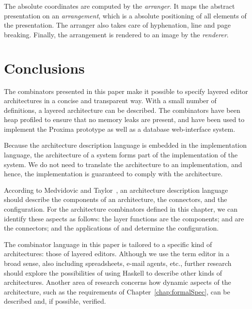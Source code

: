 \documentclass[preprint,natbib]{sigplanconf}
\begin{document}
The absolute coordinates are computed by the {\em arranger}. It maps the abstract presentation on an {\em arrangement}, which is a absolute positioning of all elements of the presentation. The arranger also takes care of hyphenation, line and page breaking. Finally, the arrangement is rendered to an image by the {\em renderer}.
\ec


%																
%																
%																
\section{Conclusions} \label{sect:haskellconclusions}

The combinators presented in this paper make it possible to specify layered editor architectures in a concise and transparent way. With a small number of definitions, a layered architecture can be described. The combinators have been heap profiled to ensure that no memory leaks are present, and have been used to implement the Proxima prototype as well as a database web-interface system.

Because the architecture description language is embedded in the implementation language, the architecture of a system forms part of the implementation of the system. We do not need to translate the architecture to an implementation, and hence, the implementation is guaranteed to comply with the architecture.

According to Medvidovic and Taylor~\cite{medvidovic00ADLs}, an architecture description language should describe the components of an architecture, the connectors, and the configuration. For the architecture combinators defined in this chapter, we can identify these aspects as follows: the layer functions are the components;  and  are the connectors; and the applications of  and  determine the configuration.

The combinator language in this paper is tailored to a specific kind of architectures: those of layered editors. Although we use the term editor in a broad sense, also including spreadsheets, e-mail agents, etc., further research should explore the possibilities of using Haskell to describe other kinds of architectures. Another area of research concerns how dynamic aspects of the architecture, such as the requirements of Chapter~\ref{chap:formalSpec}, can be described and, if possible, verified.









\end{document}
